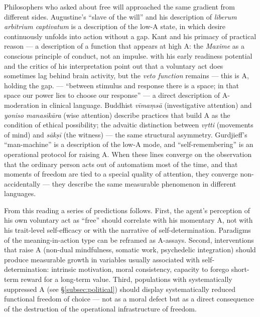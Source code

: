 Philosophers who asked about free will approached the same gradient from different sides. Augustine's ``slave of the will'' and his description of \textit{liberum arbitrium captivatum} is a description of the low-A state, in which desire continuously unfolds into action without a gap. Kant and his primacy of practical reason --- a description of a function that appears at high A: the \emph{Maxime} as a conscious principle of conduct, not an impulse. \citet{libet1985} with his early readiness potential and the critics of his interpretation \citep[see][]{frith2008} point out that a voluntary act does sometimes lag behind brain activity, but the \emph{veto function} remains --- this is A, holding the gap. \citet{frankl1946} --- ``between stimulus and response there is a space; in that space our power lies to choose our response'' --- a direct description of A-moderation in clinical language. Buddhist \textit{vīmaṃsā} (investigative attention) and \textit{yoniso manasikāra} (wise attention) describe practices that build A as the condition of ethical possibility; the advaitic distinction between \textit{vṛtti} (movements of mind) and \textit{sākṣī} (the witness) --- the same structural asymmetry. Gurdjieff's ``man-machine'' is a description of the low-A mode, and ``self-remembering'' is an operational protocol for raising A. When these lines converge on the observation that the ordinary person acts out of automatism most of the time, and that moments of freedom are tied to a special quality of attention, they converge non-accidentally --- they describe the same measurable phenomenon in different languages.

From this reading a series of predictions follows. First, the agent's perception of his own voluntary act as ``free'' should correlate with his momentary A, not with his trait-level self-efficacy or with the narrative of self-determination. Paradigms of the \citet{westgate2019} meaning-in-action type can be reframed as A-assays. Second, interventions that raise A (non-dual mindfulness, somatic work, psychedelic integration) should produce measurable growth in variables usually associated with self-determination: intrinsic motivation, moral consistency, capacity to forego short-term reward for a long-term value. Third, populations with systematically suppressed A (see §\ref{subsec:political}) should display systematically reduced functional freedom of choice --- not as a moral defect but as a direct consequence of the destruction of the operational infrastructure of freedom.

